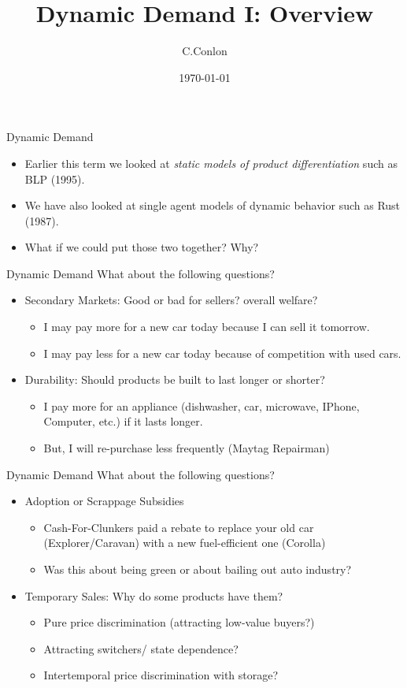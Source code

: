 \documentclass[aspectratio=169,11pt]{beamer}
\title [Dynamic Demand II]{Dynamic Demand I: Overview }
\author{C.Conlon}
\institute{Grad IO }
\date{\today}
\begin{document}
\begin{frame}
\titlepage
\end{frame}


\begin{frame}{Dynamic Demand}
\begin{itemize}
\item Earlier this term we looked at \textit{static models of product differentiation} such as BLP (1995).
\item We have also looked at single agent models of dynamic behavior such as Rust (1987).
\item What if we could put those two together? Why?
\end{itemize}
\end{frame}

\begin{frame}{Dynamic Demand}
What about the following questions?
\begin{itemize}
\item Secondary Markets: Good or bad for sellers? overall welfare?
\begin{itemize}
\item I may pay \alert{more} for a new car today because I can sell it tomorrow.
\item I may pay \alert{less} for a new car today because of competition with used cars.
\end{itemize}
\item Durability: Should products be built to last longer or shorter?
\begin{itemize}
\item I pay \alert{more} for an appliance (dishwasher, car, microwave, IPhone, Computer, etc.) if it 
\alert{lasts longer}.
\item But, I will re-purchase less frequently (Maytag Repairman)
\end{itemize}
\end{itemize}
\end{frame}


\begin{frame}{Dynamic Demand}
What about the following questions?
\begin{itemize}
\item Adoption or Scrappage Subsidies
\begin{itemize}
\item Cash-For-Clunkers paid a rebate to replace your old car (Explorer/Caravan) with a new fuel-efficient one (Corolla)
\item Was this about being green or about bailing out auto industry?
\end{itemize}
\item Temporary Sales: Why do some products have them?
\begin{itemize}
\item Pure price discrimination (attracting low-value buyers?) 
\item Attracting switchers/ state dependence?
\item Intertemporal price discrimination with storage?
\end{itemize}
\end{itemize}
\end{frame}
\end{document}
